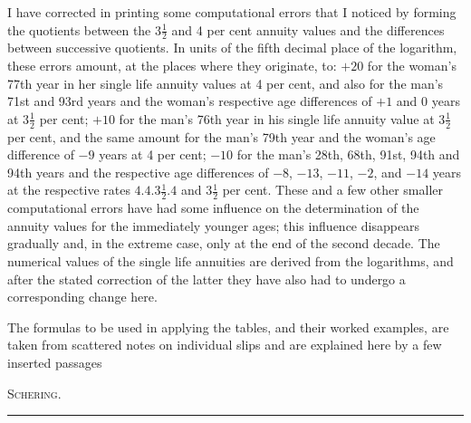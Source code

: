I have corrected in printing some computational errors that I noticed by forming the quotients between the \(3\tfrac{1}{2}\) and 4 per cent annuity values and the differences between successive quotients. In units of the fifth decimal place of the logarithm, these errors amount, at the places where they originate, to: \(+20\) for the woman's 77th year in her single life annuity values at 4 per cent, and also for the man's 71st and 93rd years and the woman's respective age differences of \(+1\) and 0 years at \(3\tfrac{1}{2}\) per cent; \(+10\) for the man's 76th year in his single life annuity value at \(3\tfrac{1}{2}\) per cent, and the same amount for the man's 79th year and the woman's age difference of \(-9\) years at 4 per cent; \(-10\) for the man's 28th, 68th, 91st, 94th and 94th years and the respective age differences of \(-8\), \(-13\), \(-11\), \(-2\), and \(-14\) years at the respective rates \(4.4.3\tfrac{1}{2}.4\) and \(3\tfrac{1}{2}\) per cent. These and a few other smaller computational errors have had some influence on the determination of the annuity values for the immediately younger ages; this influence disappears gradually and, in the extreme case, only at the end of the second decade. The numerical values of the single life annuities are derived from the logarithms, and after the stated correction of the latter they have also had to undergo a corresponding change here.

The formulas to be used in applying the tables, and their worked examples, are taken from scattered notes on individual slips and are explained here by a few inserted passages
\begin{flushright}\textsc{Schering.}\end{flushright}
\begin{center}\rule{.3\linewidth}{.3pt}\end{center}
